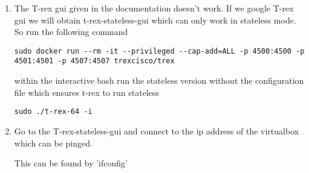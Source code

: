 \documentclass[conference, english, letterpaper, onecolumn, draft]{IEEEtran}
\begin{document}
\begin{enumerate}
\item The T-rex gui given in the documentation doesn't work. 
If we google T-rex gui we will obtain t-rex-stateless-gui which can only work in stateless mode. So run the following command 

\begin{verbatim}
sudo docker run --rm -it --privileged --cap-add=ALL -p 4500:4500 -p 4501:4501 -p 4507:4507 trexcisco/trex
\end{verbatim}

within the interactive bash run the stateless version without the  configuration file which ensures t-rex to run stateless

\begin{verbatim}
sudo ./t-rex-64 -i 
\end{verbatim}

\item Go to the T-rex-stateless-gui and connect to the ip address of the virtualbox which can be pinged.
 
This can be found by 'ifconfig'
\end{enumerate}
\label{pagecount}
\end{document}
